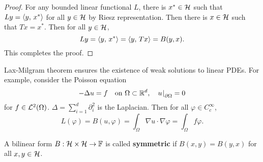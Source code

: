 \begin{proof}
    For any bounded linear functional $L$, there is $x^*\in\mathcal{H}$ such that 
    $Ly = \left\langle {y},\, {x^*} \right\rangle$ for all $y\in\mathcal{H}$ by Riesz representation. 
    Then there is $x\in\mathcal{H}$ such that $Tx = x^*$. Then for all $y\in\mathcal{H}$, 
    \begin{equation*}
        Ly = \left\langle {y},\, {x^*} \right\rangle = \left\langle {y},\, {Tx} \right\rangle = B(y,x).
    \end{equation*}
    This completes the proof.
\end{proof}
\begin{remark}
    Lax-Milgram theorem ensures the existence of weak solutions to 
    linear PDEs. For example, consider the Poisson equation 
    \begin{equation*}
        -\Delta u = f \quad \text{on }\Omega\subset\mathbb{R}^d, \quad u\left.\hspace{-0.2em}\right|_{\partial\Omega} = 0
    \end{equation*}
    for $f\in\mathcal{L}^2(\Omega)$. $\Delta = \sum_{i=1}^{d}\partial_i^2$ is 
    the Laplacian. Then for all $\varphi\in C^\infty_c$, 
    \begin{equation*}
        L(\varphi) = B(u,\varphi) = \int_{\Omega} \nabla u\cdot\nabla\varphi = \int_{\Omega} f\varphi.
    \end{equation*} 
\end{remark}

\begin{definition}
    A bilinear form $B:\mathcal{H}\times\mathcal{H}\to\mathbb{F}$ is called \textbf{symmetric} 
    if $B(x,y) = B(y,x)$ for all $x,y\in\mathcal{H}$.
\end{definition}

